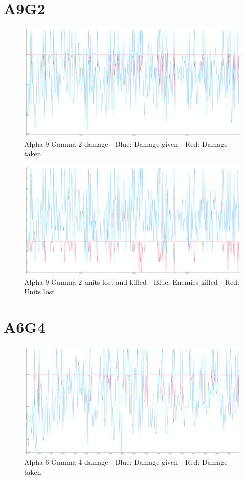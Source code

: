 \section{A9G2}
\begin{figure}[H]
\includegraphics[angle=-90, scale=0.30]{Figures/learningrate/A9G2/damage.png}
\caption{Alpha 9 Gamma 2 damage - Blue: Damage given - Red: Damage taken}
\label{fig:app_a9g2_damage}
\end{figure}


\begin{figure}[H]
\includegraphics[angle=-90, scale=0.25]{Figures/learningrate/A9G2/units_lost_and_killed.png}
\caption{Alpha 9 Gamma 2 units lost and killed - Blue: Enemies killed - Red: Units lost}
\label{fig:app_a9g2_lak}
\end{figure}
	
\section{A6G4}
\begin{figure}[H]
\includegraphics[angle=-90, scale=0.25]{Figures/learningrate/A6G4/damage.png}
\caption{Alpha 6 Gamma 4 damage - Blue: Damage given - Red: Damage taken}
\label{fig:app_a6g4_damage}
\end{figure}	
			


